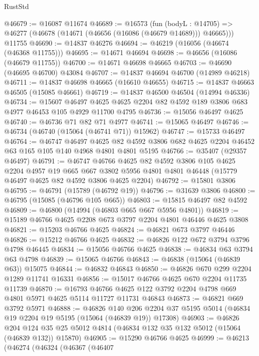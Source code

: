 \begin{lexlean}{RustStd}
\begin{coremodule}
@46679 := @16087 @11674
@46689 := @16573
    (fun (bodyL : @14705) => @46277 (@46678 (@14671 (@46656 (@16086 (@46679 @14689))) @46665)))
    @11755
@46690 := @14837 @46276
@46694 := @46219 (@16056 (@46674 (@46368 @11755)))
@46695 := @14671 @46694
@46698 := @46656 (@16086 (@46679 @11755))
@46700 := @14671 @46698 @46665
@46703 := @46690 (@46695 @46700) @43084
@46707 := @14837 @46694 @46700 (@14989 @46218)
@46711 := @14837 @46698 @46665 (@16610 @46655)
@46715 := @14837 @46663 @46505 (@15085 @46661)
@46719 := @14837 @46500 @46504 (@14994 @46336)
@46734 := @15607
    @46497
    @4625
    @4625
    @2204
    @82
    @4592
    @189
    @3806
    @683
    @4977
    @46453
    @105
    @4929
    @11700
    @4795
@46736 := @15056 @46497 @4625
@46740 := @46736 @71 @82 @71 @4977
@46741 := @15065 @46497
@46746 := @46734 (@46740 (@15064 (@46741 @71)) @15962)
@46747 := @15733 @46497
@46764 := @46747
    @46497
    @4625
    @82
    @4592
    @3806
    @682
    @4625
    @2204
    @46452
    @63
    @165
    @105
    @140
    @4968
    @4801
    @4801
    @5195
@46766 := @35407 (@29357 @46497)
@46791 := @46747
    @46766
    @4625
    @82
    @4592
    @3806
    @105
    @4625
    @2204
    @4957
    @19
    @665
    @667
    @3802
    @5956
    @4801
    @4801
    @46448
    (@15779 @46497 @4625 @82 @4592 @3806 @4625 @2204)
@46792 := @15801 @3806
@46795 := @46791 (@15789 (@46792 @19))
@46796 := @31639 @3806
@46800 := @46795 (@15085 (@46796 @105 @665))
@46803 := @15815 @46497 @82 @4592
@46809 := @46800 (@14994 (@46803 @665 @667 @5956 @4801))
@46819 := @15189 @46766 @4625 @2208 @673 @3797 @2204 @4801 @46446 @4625 @3808
@46821 := @15203 @46766 @4625
@46824 := @46821 @673 @3797 @46446
@46826 := @15212 @46766 @4625
@46832 := @46826 @122 @672 @3794 @3796 @4798 @46445
@46834 := @15056 @46766 @4625
@46838 := @46834 @63 @3794 @63 @4798
@46839 := @15065 @46766
@46843 := @46838 (@15064 (@46839 @63)) @15075
@46844 := @46832 @46843
@46850 := @46826 @670 @299 @2204 @1289 @11741 @16331
@46856 := @15017 @46766 @4625 @670 @2204 @11735 @11739
@46870 := @16793
    @46766
    @4625
    @122
    @3792
    @2204
    @4798
    @669
    @4801
    @5971
    @4625
    @5114
    @11727
    @11731
    @46843
@46873 := @46821 @669 @3792 @5971
@46888 := @46826
    @140
    @206
    @2204
    @37
    @5195
    @5014
    (@46834 @19 @2204 @19 @5195 (@15064 (@46839 @19)) @17308)
@46903 := @46826
    @204
    @124
    @35
    @25
    @5012
    @4814
    (@46834 @132 @35 @132 @5012 (@15064 (@46839 @132)) @15870)
@46905 := @15290 @46766 @4625
@46999 := @46213
    (@46274
      (@46324
        (@46367
          (@46407

\end{coremodule}
\end{lexlean}
